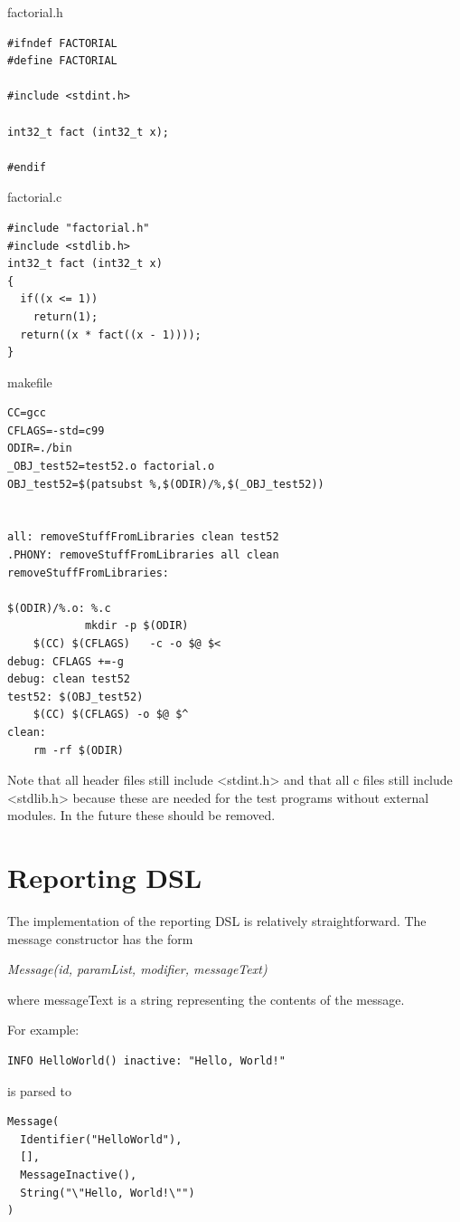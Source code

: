 \documentclass[a4paper,10pt,titlepage]{report}
\begin{document}
factorial.h
\begin{lstlisting}
#ifndef FACTORIAL
#define FACTORIAL
 
#include <stdint.h>
 
int32_t fact (int32_t x);
 
#endif
\end{lstlisting}

factorial.c
\begin{lstlisting}
#include "factorial.h"
#include <stdlib.h>
int32_t fact (int32_t x)
{
  if((x <= 1))
	return(1);
  return((x * fact((x - 1))));
}
\end{lstlisting}

makefile
\begin{lstlisting}
CC=gcc
CFLAGS=-std=c99
ODIR=./bin
_OBJ_test52=test52.o factorial.o
OBJ_test52=$(patsubst %,$(ODIR)/%,$(_OBJ_test52))
 
 
all: removeStuffFromLibraries clean test52
.PHONY: removeStuffFromLibraries all clean
removeStuffFromLibraries:
   	
$(ODIR)/%.o: %.c
         	mkdir -p $(ODIR)
   	$(CC) $(CFLAGS)   -c -o $@ $< 
debug: CFLAGS +=-g
debug: clean test52
test52: $(OBJ_test52)
   	$(CC) $(CFLAGS) -o $@ $^  
clean:
   	rm -rf $(ODIR) 
\end{lstlisting}

Note that all header files still include <stdint.h> and that all c files still include <stdlib.h> because these are needed for the test programs without external modules. In the future these should be removed.

\chapter{Reporting DSL}
The implementation of the reporting DSL is relatively straightforward. The message constructor has the form 

\emph{Message(id, paramList, modifier, messageText)}

where messageText is a string representing the contents of the message. 

For example: 
\begin{lstlisting}
INFO HelloWorld() inactive: "Hello, World!"
\end{lstlisting}

is parsed to 
\begin{lstlisting}
Message(
  Identifier("HelloWorld"), 
  [], 
  MessageInactive(), 
  String("\"Hello, World!\"")
)
\end{lstlisting}
\end{document}

